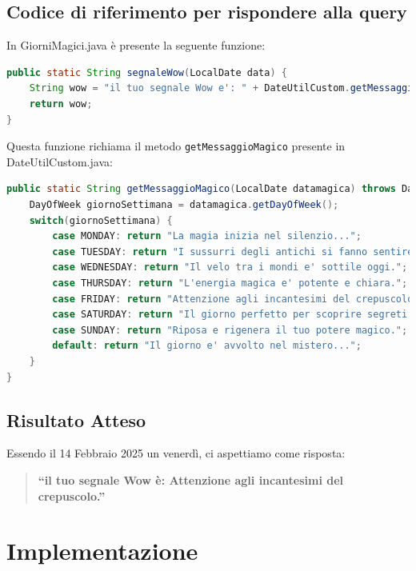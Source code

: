 \documentclass[12pt,a4paper,openright,twoside]{book}
\begin{document}
\subsection{Codice di riferimento per rispondere alla query}
In GiorniMagici.java è presente la seguente funzione:
\begin{lstlisting}[language=Java, caption={Metodo segnaleWow in GiorniMagici.java}, label={lst:segnaleWow}]
public static String segnaleWow(LocalDate data) {
    String wow = "il tuo segnale Wow e': " + DateUtilCustom.getMessaggioMagico(date);
    return wow;
}
\end{lstlisting}
Questa funzione richiama il metodo \texttt{getMessaggioMagico} presente in DateUtilCustom.java:

\begin{lstlisting}[language=Java, caption={Metodo getMessaggioMagico in DateUtilCustom.java}, label={lst:getMessaggioMagico}]
public static String getMessaggioMagico(LocalDate datamagica) throws DateTimeParseException {
    DayOfWeek giornoSettimana = datamagica.getDayOfWeek();
    switch(giornoSettimana) {
        case MONDAY: return "La magia inizia nel silenzio...";
        case TUESDAY: return "I sussurri degli antichi si fanno sentire.";
        case WEDNESDAY: return "Il velo tra i mondi e' sottile oggi.";
        case THURSDAY: return "L'energia magica e' potente e chiara.";
        case FRIDAY: return "Attenzione agli incantesimi del crepuscolo.";
        case SATURDAY: return "Il giorno perfetto per scoprire segreti nascosti.";
        case SUNDAY: return "Riposa e rigenera il tuo potere magico.";
        default: return "Il giorno e' avvolto nel mistero...";
    }
}
\end{lstlisting}

\subsection{Risultato Atteso}
Essendo il 14 Febbraio 2025 un venerdì, ci aspettiamo come risposta:
\begin{quote}
    \textbf{``il tuo segnale Wow è: Attenzione agli incantesimi del crepuscolo.''}
\end{quote}

\section{Implementazione}
\end{document}
